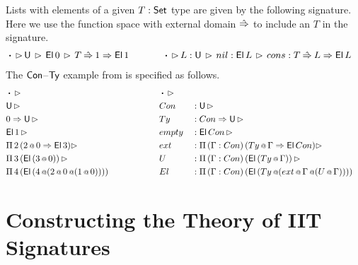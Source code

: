 \documentclass[a4paper,UKenglish,cleveref, autoref]{lipics-v2019}
\begin{document}
Lists with elements of a given $T : \mathsf{Set}$ type are given by the
following signature. Here we use the function space with external domain $\mathbin{\hat{\Rightarrow}}$ to include
an $T$ in the signature.
\begin{alignat*}{10}
 & \boldsymbol{\cdot}\,\ext\,\U\,\ext\,\El\,0\,\ext\,T\Ram 1\Ra \El\,1 \hspace{3.56em} \boldsymbol{\cdot}\,\ext\,L:\U\,\ext\,nil : \El\,L\,\ext\,cons : T\Ram L\Ra \El\,L
\end{alignat*}
The $\mathsf{Con}$--$\mathsf{Ty}$ example from  is specified as
follows.
\begin{alignat*}{5}
  & \boldsymbol{\cdot} \,\rhd                                                 && \boldsymbol{\cdot} \,\rhd                                                                \\
  & \mathsf{U}\,\rhd                                                                  && Con && : \mathsf{U}\,\rhd                                                                        \\
  & 0\Rightarrow\mathsf{U}\,\rhd                                                              && Ty && : Con\Rightarrow\mathsf{U}\,\rhd                                                                   \\
  & \mathsf{El}\,1\,\rhd                                                              && empty && : \mathsf{El}\,Con\,\rhd                                                                \\
  & \Pi\,2\,(2\mathop{{\scriptstyle @}} 0 \Rightarrow \mathsf{El}\,3)\rhd                                       && ext && : \Pi\,(\Gamma : Con)\,(Ty\mathop{{\scriptstyle @}}\Gamma \Rightarrow \mathsf{El}\,Con)\rhd                         \\
  & \Pi\,3\,(\mathsf{El}\,(3\mathop{{\scriptstyle @}} 0))\,\rhd                                         && U && : \Pi\,(\Gamma:Con)\,(\mathsf{El}\,(Ty\mathop{{\scriptstyle @}}\Gamma))\,\rhd                                 \\
  & \Pi\,4\,(\mathsf{El}\,(4\mathop{{\scriptstyle @}}(2\mathop{{\scriptstyle @}} 0\mathop{{\scriptstyle @}} (1\mathop{{\scriptstyle @}} 0)))) \hspace{4.79em} && El && : \Pi\,(\Gamma : Con)\,(\mathsf{El}\,(Ty\mathop{{\scriptstyle @}}(ext\mathop{{\scriptstyle @}}\Gamma\mathop{{\scriptstyle @}} (U\mathop{{\scriptstyle @}}\Gamma))))
\end{alignat*}

\section{Constructing the Theory of IIT Signatures}
\label{sec:ambroise}


\end{document}
